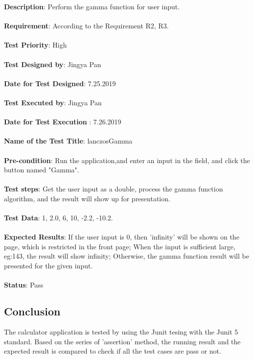 \documentclass[a4paper, 11pt]{article}
\begin{document}
\textbf{Description}: Perform the gamma function for user input.\\\\
\noindent
\textbf{Requirement}: According to the Requirement R2, R3.\\\\
\noindent
\textbf{Test Priority}: High\\\\
\noindent
\textbf{Test Designed by}: Jingya Pan\\\\
\noindent
\textbf{Date for Test Designed}: 7.25.2019\\\\
\noindent
\textbf{Test Executed by}: Jingya Pan\\\\
\noindent
\textbf{Date for Test Execution} : 7.26.2019\\\\
\noindent
\textbf{Name of the Test Title}: lanczosGamma\\\\
\noindent
\textbf{Pre-condition}: Run the application,and enter an input in the field, and click the button named "Gamma".\\\\
\noindent
\textbf{Test steps}: Get the user input as a double, process the gamma function algorithm, and the result will show up for presentation.\\\\
\noindent
\textbf{Test Data}: 1, 2.0, 6, 10, -2.2, -10.2. \\\\
\noindent
\textbf{Expected Results}: If the user input is 0, then 'infinity' will be shown on the page, which is restricted in the front page; When the input is sufficient large, eg:143, the result will show infinity; Otherwise, the gamma function result will be presented for the given input.\\\\
\noindent
\textbf{Status}: Pass

\subsection{Conclusion}
The calculator application is tested by using the Junit tesing with the Junit 5 standard. Based on the series of 'assertion' method, the running result and the expected result is compared to check if all the test cases are pass or not.
\end{document}
